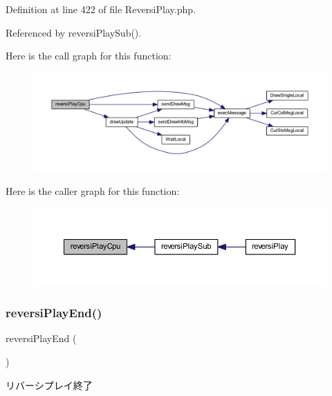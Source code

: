 Definition at line 422 of file Reversi\+Play.\+php.



Referenced by reversi\+Play\+Sub().

Here is the call graph for this function\+:\nopagebreak
\begin{figure}[H]
\begin{center}
\leavevmode
\includegraphics[width=350pt]{class_reversi_play_a6514ad9244af720ee1ec1777c11e80fb_cgraph}
\end{center}
\end{figure}
Here is the caller graph for this function\+:\nopagebreak
\begin{figure}[H]
\begin{center}
\leavevmode
\includegraphics[width=350pt]{class_reversi_play_a6514ad9244af720ee1ec1777c11e80fb_icgraph}
\end{center}
\end{figure}
\mbox{\label{class_reversi_play_af55fe6b6f2005c7da80c696ed692783d}} 
\subsubsection{\texorpdfstring{reversi\+Play\+End()}{reversiPlayEnd()}}
{\footnotesize\ttfamily reversi\+Play\+End (\begin{DoxyParamCaption}{ }\end{DoxyParamCaption})}



リバーシプレイ終了 

